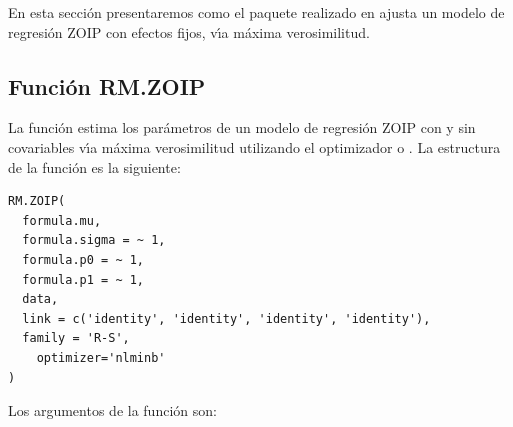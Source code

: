 En esta secci\'{o}n presentaremos como el paquete  realizado en  ajusta un modelo de regresi\'{o}n ZOIP con efectos fijos, v\'{\i}a m\'{a}xima verosimilitud.

%
%

\subsection{Funci\'{o}n RM.ZOIP}

La funci\'{o}n  estima los par\'{a}metros de un modelo de regresi\'{o}n ZOIP con y sin covariables v\'{\i}a m\'{a}xima verosimilitud utilizando el optimizador  o . La estructura de la funci\'{o}n  es la siguiente:

\begin{verbatim}
RM.ZOIP(
  formula.mu,
  formula.sigma = ~ 1,
  formula.p0 = ~ 1,
  formula.p1 = ~ 1,
  data,
  link = c('identity', 'identity', 'identity', 'identity'),
  family = 'R-S',
	optimizer='nlminb'
)
\end{verbatim}

Los argumentos de la funci\'{o}n  son:

